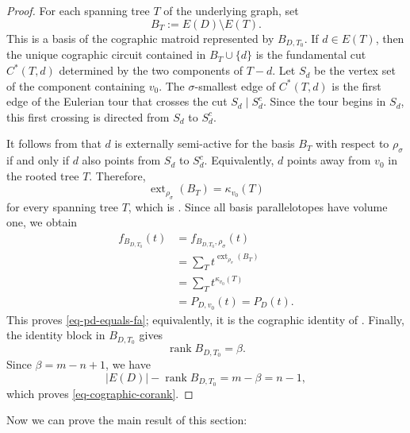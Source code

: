 \documentclass[12pt]{amsart}
\numberwithin{equation}{section}
\numberwithin{theorem}{section}
\begin{document}
\begin{proof}
  For each spanning tree $T$ of the underlying graph, set
  \[
  B_T:=E(D)\setminus E(T).
  \]
  This is a basis of the cographic matroid represented by $B_{D,T_0}$. If $d\in E(T)$, then the unique cographic circuit contained in $B_T\cup\{d\}$ is the fundamental cut $C^*(T,d)$ determined by the two components of $T-d$. Let $S_d$ be the vertex set of the component containing $v_0$. The $\sigma$-smallest edge of $C^*(T,d)$ is the first edge of the Eulerian tour that crosses the cut $S_d\mid S_d^c$. Since the tour begins in $S_d$, this first crossing is directed from $S_d$ to $S_d^c$.

  It follows from \cite[Lemma~5.1]{KMP} that $d$ is externally semi-active for the basis $B_T$ with respect to $\rho_\sigma$ if and only if $d$ also points from $S_d$ to $S_d^c$. Equivalently, $d$ points away from $v_0$ in the rooted tree $T$. Therefore,
  \[
  \operatorname{ext}_{\rho_\sigma}(B_T)=\kappa_{v_0}(T)
  \]
  for every spanning tree $T$, which is \cite[Lemma~5.2]{KMP}. Since all basis parallelotopes have volume one, we obtain
  \[
  \begin{aligned}
  f_{B_{D,T_0}}(t)
  &= f_{B_{D,T_0},\rho_\sigma}(t)\\
  &= \sum_T t^{\operatorname{ext}_{\rho_\sigma}(B_T)}\\
  &= \sum_T t^{\kappa_{v_0}(T)}\\
  &= P_{D,v_0}(t)=P_D(t).
  \end{aligned}
  \]
  This proves \eqref{eq-pd-equals-fa}; equivalently, it is the cographic identity of \cite[Theorem~5.3]{KMP}. Finally, the identity block in $B_{D,T_0}$ gives
  \[
  \operatorname{rank}B_{D,T_0}=\beta.
  \]
  Since $\beta=m-n+1$, we have
  \[
  |E(D)|-\operatorname{rank}B_{D,T_0} = m-\beta = n-1,
  \]
  which proves \eqref{eq-cographic-corank}.
\end{proof}

Now we can prove the main result of this section:
\end{document}
